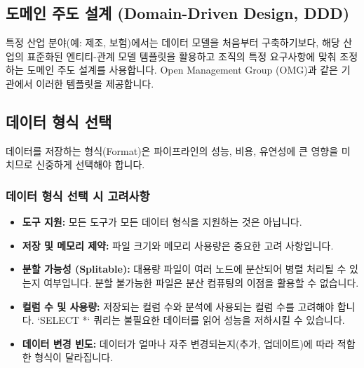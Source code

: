\documentclass[11pt,a4paper]{article}
\begin{document}
\subsection{도메인 주도 설계 (Domain-Driven Design, DDD)}
특정 산업 분야(예: 제조, 보험)에서는 데이터 모델을 처음부터 구축하기보다, 해당 산업의 표준화된 엔티티-관계 모델 템플릿을 활용하고 조직의 특정 요구사항에 맞춰 조정하는 도메인 주도 설계를 사용합니다. Open Management Group (OMG)과 같은 기관에서 이러한 템플릿을 제공합니다.

\subsection{데이터 형식 선택}
데이터를 저장하는 형식(Format)은 파이프라인의 성능, 비용, 유연성에 큰 영향을 미치므로 신중하게 선택해야 합니다.

\subsubsection{데이터 형식 선택 시 고려사항}
\begin{itemize}
    \item \textbf{도구 지원:} 모든 도구가 모든 데이터 형식을 지원하는 것은 아닙니다.
    \item \textbf{저장 및 메모리 제약:} 파일 크기와 메모리 사용량은 중요한 고려 사항입니다.
    \item \textbf{분할 가능성 (Splitable):} 대용량 파일이 여러 노드에 분산되어 병렬 처리될 수 있는지 여부입니다. 분할 불가능한 파일은 분산 컴퓨팅의 이점을 활용할 수 없습니다.
    \item \textbf{컬럼 수 및 사용량:} 저장되는 컬럼 수와 분석에 사용되는 컬럼 수를 고려해야 합니다. `SELECT *` 쿼리는 불필요한 데이터를 읽어 성능을 저하시킬 수 있습니다.
    \item \textbf{데이터 변경 빈도:} 데이터가 얼마나 자주 변경되는지(추가, 업데이트)에 따라 적합한 형식이 달라집니다.
\end{itemize}
\end{document}
